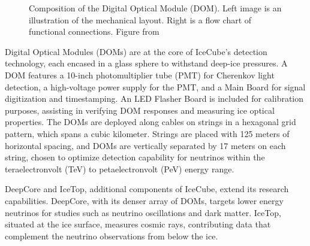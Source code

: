 \begin{figure}
    \caption{Composition of the Digital Optical Module (DOM). Left image is an illustration of the mechanical layout. Right is a flow chart of functional connections. Figure from \cite{IC3_thedetector}}
    \label{fig:DOM}
\end{figure}

Digital Optical Modules (DOMs) are at the core of IceCube’s detection technology, each encased in a glass sphere to withstand deep-ice pressures.
A DOM features a 10-inch photomultiplier tube (PMT) for Cherenkov light detection, a high-voltage power supply for the PMT, and a Main Board for signal digitization and timestamping.
An LED Flasher Board is included for calibration purposes, assisting in verifying DOM responses and measuring ice optical properties.
The DOMs are deployed along cables on strings in a hexagonal grid pattern, which spans a cubic kilometer.
Strings are placed with 125 meters of horizontal spacing, and DOMs are vertically separated by 17 meters on each string, chosen to optimize detection capability for neutrinos within the teraelectronvolt (TeV) to petaelectronvolt (PeV) energy range.

DeepCore and IceTop, additional components of IceCube, extend its research capabilities.
DeepCore, with its denser array of DOMs, targets lower energy neutrinos for studies such as neutrino oscillations and dark matter.
IceTop, situated at the ice surface, measures cosmic rays, contributing data that complement the neutrino observations from below the ice.

